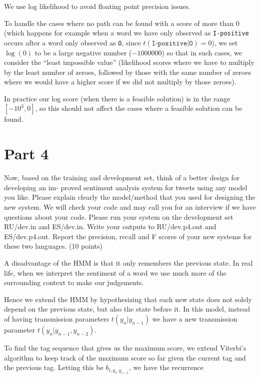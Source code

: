 \documentclass[
]{article}
\begin{document}
We use log likelihood to avoid floating point precision issues.

To handle the cases where no path can be found with a score of more than
0 (which happens for example when a word we have only observed as
\texttt{I-positive} occurs after a word only observed as \texttt{O},
since $t(\texttt{I-positive} | \texttt{O}) = 0$), we set $\log(0)$
to be a large negative number ($-1000000$) so that in such cases,
we consider the ``least impossible value'' (likelihood scores where we
have to multiply by the least number of zeroes, followed by those with
the same number of zeroes where we would have a higher score if we did
not multiply by those zeroes).

In practice our log score (when there is a feasible solution) is in the
range $[-10^3, 0]$, so this should not affect the cases
where a feasible solution can be found.

\hypertarget{part-4}{%
\section{Part 4}\label{part-4}}

Now, based on the training and development set, think of a better design
for developing an im- proved sentiment analysis system for tweets using
any model you like. Please explain clearly the model/method that you
used for designing the new system. We will check your code and may call
you for an interview if we have questions about your code. Please run
your system on the development set RU/dev.in and ES/dev.in. Write your
outputs to RU/dev.p4.out and ES/dev.p4.out. Report the precision, recall
and F scores of your new systems for these two languages. (10 points)

A disadvantage of the HMM is that it only remembers the previous state.
In real life, when we interpret the sentiment of a word we use much more
of the surrounding context to make our judgements.

Hence we extend the HMM by hypothesizing that each new state does not
solely depend on the previous state, but also the state before it. In
this model, instead of having transmission parameters
\(t(y_n | y_{n-1})\) we have a new transmission parameter
\(t(y_n | y_{n-1}, y_{n-2})\).

To find the tag sequence that gives us the maximum score, we extend
Viterbi's algorithm to keep track of the maximum score so far given the
current tag and the previous tag. Letting this be
\(b_{i, y_i, y_{i-1}}\), we have the recurrence
\end{document}
